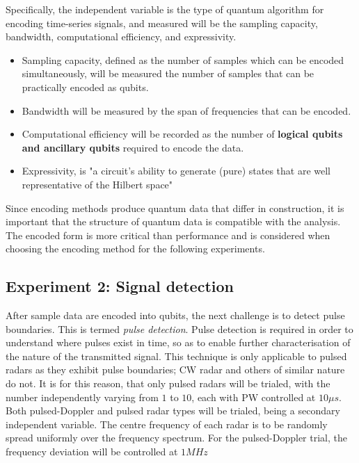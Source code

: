 Specifically, the independent variable is the type of quantum algorithm for encoding time-series signals, and measured will be the sampling capacity, bandwidth, computational efficiency, and expressivity.
\begin{itemize}
    \item Sampling capacity, defined as the number of samples which can be encoded simultaneously, will be measured the number of samples that can be practically encoded as qubits.
    \item Bandwidth will be measured by the span of frequencies that can be encoded.
    \item Computational efficiency will be recorded as the number of \textbf{logical qubits and ancillary qubits} required to encode the data.
    \item Expressivity, is "a circuit’s ability to generate (pure) states that are well representative of the Hilbert space" \cite{sim_expressibility_2019} 
\end{itemize}
Since encoding methods produce quantum data that differ in construction, it is important that the structure of quantum data is compatible with the analysis.
The encoded form is more critical than performance and is considered when choosing the encoding method for the following experiments.


\subsection{Experiment 2: Signal detection}

After sample data are encoded into qubits, the next challenge is to detect pulse boundaries. This is termed \textit{pulse detection}.
Pulse detection is required in order to understand where pulses exist in time, so as to enable further characterisation of the nature of the transmitted signal.
This technique is only applicable to pulsed radars as they exhibit pulse boundaries; \ac{CW} radar and others of similar nature do not.
It is for this reason, that only pulsed radars will be trialed, with the number independently varying from $1$ to $10$, each with \ac{PW} controlled at $10 \mu s$.
Both pulsed-Doppler and pulsed radar types will be trialed, being a secondary independent variable.
The centre frequency of each radar is to be randomly spread uniformly over the frequency spectrum.
For the pulsed-Doppler trial, the frequency deviation will be controlled at $1MHz$

